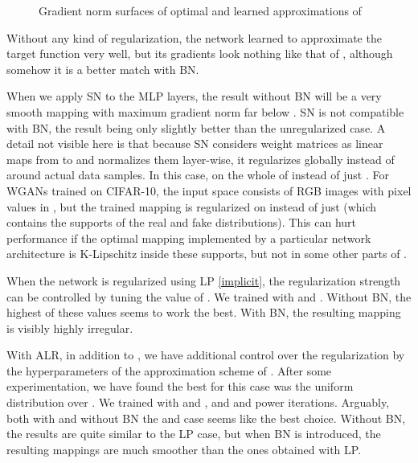 \documentclass{article}
\begin{document}
\begin{figure}[h]
\caption{Gradient norm surfaces of optimal and learned approximations of }
\label{toy_mappings}
\end{figure}

Without any kind of regularization, the network learned to approximate the target function very well, but its gradients look nothing like that of , although somehow it is a better match with BN.

When we apply SN to the MLP layers, the result without BN will be a very smooth mapping with maximum gradient norm far below . SN is not compatible with BN, the result being only slightly better than the unregularized case. A detail not visible here is that because SN considers weight matrices as linear maps from  to  and normalizes them layer-wise, it regularizes globally instead of around actual data samples. In this case, on the whole of  instead of just . For WGANs trained on CIFAR-10, the input space consists of  RGB images with pixel values in , but the trained mapping is regularized on  instead of just  (which contains the supports of the real and fake distributions). This can hurt performance if the optimal mapping implemented by a particular network architecture is K-Lipschitz inside these supports, but not in some other parts of .

When the network is regularized using LP \eqref{implicit}, the regularization strength can be controlled by tuning the value of . We trained with  and . Without BN, the highest of these values seems to work the best. With BN, the resulting mapping is visibly highly irregular.

With ALR, in addition to , we have additional control over the regularization by the hyperparameters of the approximation scheme of . After some experimentation, we have found the best  for this case was the uniform distribution over . We trained with  and , and  and  power iterations. Arguably, both with and without BN the  and  case seems like the best choice. Without BN, the results are quite similar to the LP case, but when BN is introduced, the resulting mappings are much smoother than the ones obtained with LP.

\newpage
\end{document}
